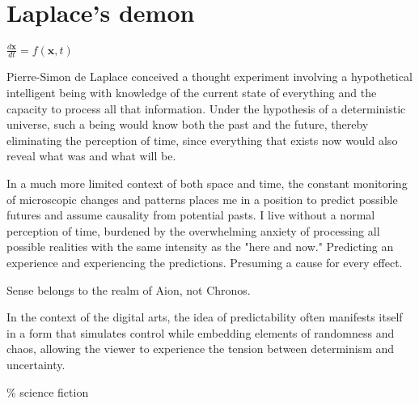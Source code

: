 \chapter*{Laplace's demon}
\begin{center}
\vspace{2cm}
\begin{flushright}
\large
\textit{$\frac{d\mathbf{x}}{dt} = f(\mathbf{x}, t)$ }
\end{flushright}
\vspace{2cm}
\end{center}
\normalsize

Pierre-Simon de Laplace conceived a thought experiment involving a hypothetical intelligent being with knowledge of the current state of everything and the capacity to process all that information. Under the hypothesis of a deterministic universe, such a being would know both the past and the future, thereby eliminating the perception of time, since everything that exists now would also reveal what was and what will be.

In a much more limited context of both space and time, the constant monitoring of microscopic changes and patterns places me in a position to predict possible futures and assume causality from potential pasts. I live without a normal perception of time, burdened by the overwhelming anxiety of processing all possible realities with the same intensity as the "here and now." Predicting an experience and experiencing the predictions. Presuming a cause for every effect. 

Sense belongs to the realm of Aion, not Chronos. \citep{deleuze1969}

In the context of the digital arts, the idea of predictability often manifests itself in a form that simulates control while embedding elements of randomness and chaos, allowing the viewer to experience the tension between determinism and uncertainty.

{\scriptsize \textcolor{comment}{\%  science fiction}}


